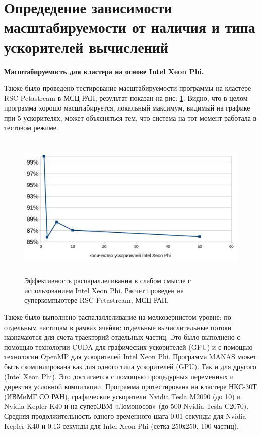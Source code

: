         
       
        
        \section{Опредедение зависимости масштабируемости от наличия и типа ускорителей вычислений}
        
        \textbf{Масштабируемость для кластера на основе Intel Xeon Phi.} 
        
       Также было проведено тестирование масштабируемости программы на кластере RSC Petastream в МСЦ РАН, результат показан на рис. \ref{phi100}. Видно, что в целом программа хорошо масштабируется, локальный максимум, видимый на графике при 5 ускорителях, может объясняться тем, что система на тот момент работала в тестовом режиме.
        
        \begin{figure}[htb]
        	\begin{center}
        		\includegraphics[height=7cm,keepaspectratio]{images/petastream_phi100.jpg}
        	\end{center}
        	\caption{Эффективность распараллеливания в слабом смысле с использованием Intel Xeon Phi. Расчет проведен на суперкомпьютере RSC Petastream, МСЦ РАН.}
        	\label{phi100}
        \end{figure}
        
        Также было выполнено распалаллеливание на мелкозернистом уровне: по отдельным частицам в рамках ячейки: отдельные вычислительные потоки назначаются для счета траекторий отдельных частиц. Это было выполнено с помощью технологии CUDA для графических ускорителей (GPU) и с помощью технологии OpenMP для ускорителей Intel Xeon Phi. Программа MANAS может быть скомпилирована как для одного типа ускорителей (GPU). Так и для другого (Intel Xeon Phi). Это достигается с помощью процедурных переменных и директив условной компиляции. Программа протестирована на кластере НКС-30Т (ИВМиМГ СО РАН), графические ускорители Nvidia Tesla M2090 (до 10) и Nvidia Kepler K40 и на суперЭВМ «Ломоносов»  (до 500 Nvidia Tesla C2070). Средняя продолжительность одного временного шага 0.01 секунды для  Nvidia Kepler K40 и 0.13 секунды для  Intel Xeon Phi (сетка 250х250, 100 частиц).
        
